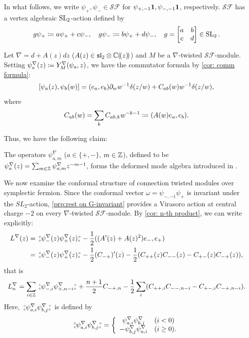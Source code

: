 \documentclass[final,reqno]{amsart}
\begin{document}
In what follows, we write $\psi_+,\psi_-\in\mathcal{SF}$ for $\psi_{+,-1}\mathbf{1},\psi_{-,-1}\mathbf{1}$, respectively.
$\mathcal{SF}$ has a vertex algebraic $\operatorname{SL}_2$-action defined by
\[
    g\psi_+\coloneqq a\psi_++c\psi_-,
    \quad
    g\psi_-\coloneqq b\psi_++d\psi_-,
    \quad
    g=
    \begin{bmatrix}
        a & b\\
        c & d
    \end{bmatrix}
    \in\operatorname{SL}_2.
\]


Let $\nabla=d+A(z)dz$ ($A(z)\in\mathfrak{sl}_2\otimes\mathbb{C}(\!( z )\!)$) and $M$ be a $\nabla$-twisted $\mathcal{SF}$-module. Setting $\psi^\nabla_a(z)\coloneqq Y^\nabla_M(\psi_a,z)$, we have the commutator formula by \cref{cor: comm formula}:
\begin{equation}\label{eq:deformed mode algeba of symplectic algebra}
        [\psi_a(z),\psi_b(w)]
        =(e_a,e_b)\partial_ww^{-1}\delta(z/w)+C_{ab}(w)w^{-1}\delta(z/w),
\end{equation}
where
\begin{equation}\label{eq:def of C}
    C_{ab}(w)=\sum_{k}C_{ab,k}w^{-k-1}\coloneqq(A(w)e_a,e_b).
\end{equation}

Thus, we have the following claim:
\begin{prp}\label{prp:deforming mode algebra of symp ferm}
    The operators $\psi_{a,m}^\nabla$ ($a\in\{+,-\}$, $m\in\mathbb{Z}$), defined to be $\psi^\nabla_a(z)=\sum_{m\in\mathbb{Z}}\psi^\nabla_{a,m}z^{-m-1}$, forms the deformed mode algebra introduced in \cite[Definition~2.1]{FL25}.  
\end{prp}

We now examine the conformal structure of connection twisted modules over symplectic fermion. Since the conformal vector $\omega=\psi_{-,-1}\psi_+$ is invariant under the $SL_2$-action, \cref{prp:rest on G-invariant} provides a Virasoro action at central charge $-2$ on every $\nabla$-twisted $\mathcal{SF}$-module. By \cref{cor: n-th product}, we can write explicitly:
\begin{align*}
    L^\nabla(z)
    &=\,\substack{\scriptscriptstyle\circ \\ \scriptscriptstyle\circ} \psi^\nabla_-(z)\psi^\nabla_+(z) \substack{\scriptscriptstyle\circ \\ \scriptscriptstyle\circ\,}-\frac{1}{2}((A'(z)+A(z)^2)e_-,e_+)\\
    &=\,\substack{\scriptscriptstyle\circ \\ \scriptscriptstyle\circ} \psi^\nabla_-(z)\psi^\nabla_+(z) \substack{\scriptscriptstyle\circ \\ \scriptscriptstyle\circ\,}-\frac{1}{2}(C_{-+})'(z)-\frac{1}{2}(C_{++}(z)C_{--}(z)-C_{+-}(z)C_{-+}(z)),
\end{align*}
that is
\begin{equation}\label{eq:conformal str}
    L^\nabla_n=\sum_{i\in\mathbb{Z}}\,\substack{\scriptscriptstyle\circ \\ \scriptscriptstyle\circ} \psi^\nabla_{-,i}\psi^\nabla_{+,n-i} \substack{\scriptscriptstyle\circ \\ \scriptscriptstyle\circ\,}+\frac{n+1}{2}C_{-+,n}-\frac{1}{2}\sum_{i}(C_{++,i}C_{--,n-i}-C_{+-,i}C_{-+,n-i}).
\end{equation}
Here, $\,\substack{\scriptscriptstyle\circ \\ \scriptscriptstyle\circ} \psi^\nabla_{a,i}\psi^\nabla_{b,j} \substack{\scriptscriptstyle\circ \\ \scriptscriptstyle\circ\,}$ is defined by
\[
    \,\substack{\scriptscriptstyle\circ \\ \scriptscriptstyle\circ} \psi^\nabla_{a,i}\psi^\nabla_{b,j} \substack{\scriptscriptstyle\circ \\ \scriptscriptstyle\circ\,}=\left\{
    \begin{array}{cl}
        \psi^\nabla_{a,i}\psi^\nabla_{b,j} & (i<0)\\
        -\psi^\nabla_{b,j}\psi^\nabla_{a,i} & (i\geq 0).
    \end{array}
    \right.
\]
\end{document}
